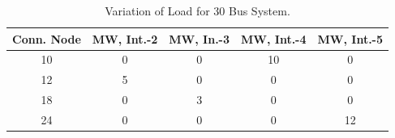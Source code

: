 \documentclass[preprint,12pt,3p]{elsarticle}
\begin{document}
\begin{table}[ht] 

\caption{Variation of Load for 30 Bus System.} %

\centering %

\begin{tabular}{| c | c | c | c | c |} %

\hline\hline %

Conn. Node & MW, Int.-2 & MW, In.-3 & MW, Int.-4  & MW, Int.-5 \\ [0.5ex] %


\hline %

10 &	0 &	0 &	10 &	0 \\ %
\hline
12 &	5 &	0 &	0 &	0 \\ %
\hline
18 &	0 &	3 &	0 &	0 \\ %
\hline
24 &	0 &	0 &	0 &	12 \\ %
\hline
\end{tabular} 

\label{table:30LASCOPFLoadModified} %

\end{table}
\end{document}
